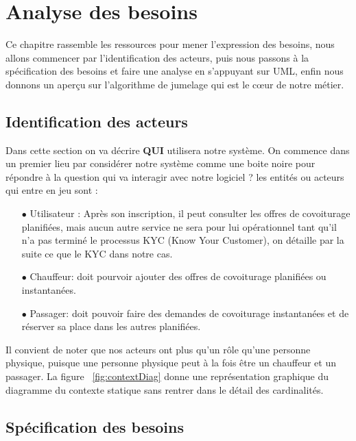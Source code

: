 \chapter{Analyse des besoins}
Ce chapitre rassemble les ressources pour mener l'expression des besoins, nous allons commencer par l'identification des acteurs, puis nous passons à la spécification des besoins et faire une analyse en s'appuyant sur UML, enfin nous donnons un aperçu sur l'algorithme de jumelage qui est le cœur de notre métier.
\section{Identification des acteurs}
Dans cette section on va décrire \textbf{QUI} utilisera notre système. On commence dans un premier lieu par considérer notre système comme une boite noire pour répondre à la question qui va interagir avec notre logiciel ?\newline
les entités ou acteurs qui entre en jeu sont :
\begin{itemize}
	\item[$\bullet$] Utilisateur : Après son inscription, il peut consulter les offres de covoiturage planifiées, mais aucun autre service ne sera pour lui opérationnel tant qu'il n'a pas terminé le processus KYC (Know Your Customer), on détaille par la suite ce que le KYC dans notre cas.
	\item[$\bullet$] Chauffeur: doit pourvoir ajouter des offres de covoiturage planifiées ou instantanées.
	\item[$\bullet$] Passager: doit pouvoir faire des demandes de covoiturage instantanées et de réserver sa place dans les autres planifiées.
\end{itemize}
Il convient de noter que nos acteurs ont plus qu'un rôle qu'une personne physique, puisque une personne physique peut à la fois être un chauffeur et un passager.\newline
La figure ~\ref{fig:contextDiag} donne une représentation graphique du diagramme du contexte statique sans rentrer dans le détail des cardinalités.

\section{Spécification des besoins}
